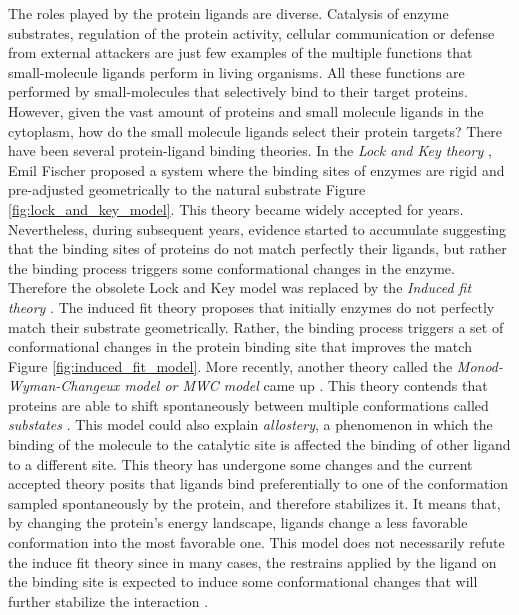 \documentclass[11pt, b5paper,twoside]{tesi_upf}
\begin{document}
\par The roles played by the protein ligands are diverse. Catalysis of enzyme substrates, regulation of the protein activity, cellular communication or defense from external attackers are just few examples of the multiple functions that small-molecule ligands perform in living organisms. All these functions are performed by small-molecules that selectively bind to their target proteins. However, given the vast amount of proteins and small molecule ligands in the cytoplasm, how do the small molecule ligands select their protein targets? There have been several protein-ligand binding theories. In the \textit{Lock and Key theory} \cite{Cramer1994}, Emil Fischer proposed a system where the binding sites of enzymes are rigid and pre-adjusted geometrically to the natural substrate Figure \ref{fig:lock_and_key_model}. This theory became widely accepted for years. Nevertheless, during subsequent years, evidence started to accumulate suggesting that the binding sites of proteins do not match perfectly their ligands, but rather the binding process triggers some conformational changes in the enzyme. Therefore the obsolete Lock and Key model was replaced by the \textit{Induced fit theory} \cite{Koshland1959}. The induced fit theory proposes that initially enzymes do not perfectly match their substrate geometrically. Rather, the binding process triggers a set of conformational changes in the protein binding site that improves the match Figure \ref{fig:induced_fit_model}. More recently, another theory called the \textit{Monod-Wyman-Changeux model or MWC model} came up \cite{Monod1965}. This theory contends that proteins are able to shift spontaneously between multiple conformations called \textit{substates} \cite{Kitao1998, Petsko1984}. This model could also explain \textit{allostery}, a phenomenon in which the binding of the molecule to the catalytic site is affected the binding of other ligand to a different site. This theory has undergone some changes and the current accepted theory posits that ligands bind preferentially to one of the conformation sampled spontaneously by the protein, and therefore stabilizes it. It means that, by changing the protein's energy landscape, ligands change a less favorable conformation into the most favorable one. This model does not necessarily refute the induce fit theory since in many cases, the restrains applied by the ligand on the binding site is expected to induce some conformational changes that will further stabilize the interaction \cite{Foote1994, James2003}. 
\end{document}
